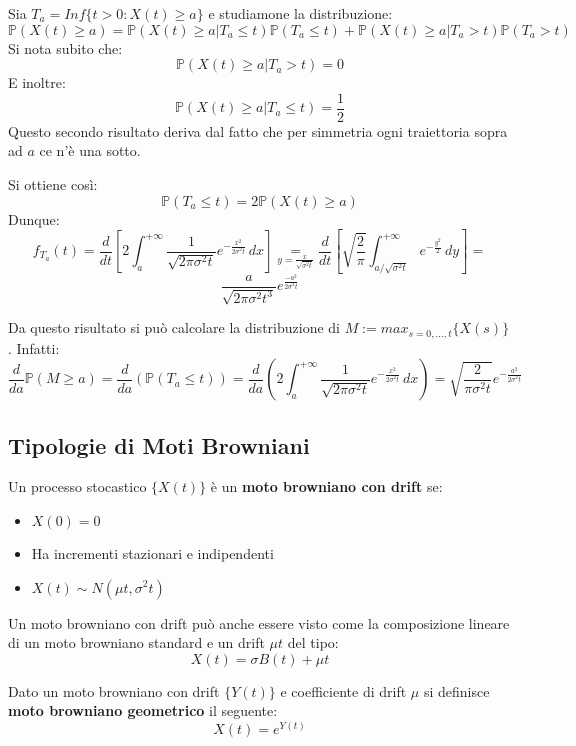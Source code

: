 \begin{example}
Sia $T_a=Inf\{t>0:X(t)\geq a\}$ e studiamone la distribuzione:
\[\mathbb{P}(X(t)\geq a)=\mathbb{P}(X(t)\geq a|T_a\leq t)\mathbb{P}(T_a\leq t)+\mathbb{P}(X(t)\geq a|T_a>t)\mathbb{P}(T_a>t)\]
Si nota subito che:
\[\mathbb{P}(X(t)\geq a|T_a > t)=0\]
E inoltre:
\[\mathbb{P}(X(t)\geq a|T_a\leq t)=\frac{1}{2}\]
Questo secondo risultato deriva dal fatto che per simmetria ogni traiettoria sopra ad $a$ ce n'è una sotto.

Si ottiene così:
\[\mathbb{P}(T_a\leq t)=2\mathbb{P}(X(t)\geq a)\]
Dunque:
\[f_{T_a}(t)=\frac{d}{dt}\left[2\int_a^{+\infty}\frac{1}{\sqrt{2\pi\sigma^2 t}}e^{-\frac{x^2}{2\sigma^2t}} \,dx\right]\underset{y=\frac{x}{\sqrt{\sigma^2t}}}{=}\frac{d}{dt}\left[\sqrt{\frac{2}{\pi}}\int_{a/\sqrt{\sigma^2t}}^{+\infty}e^{-\frac{y^2}{2}} \,dy\right]=\]
\[\frac{a}{\sqrt{2\pi\sigma^2t^3}}e^{\frac{-a^2}{2\sigma^2t}}\]
\end{example}
 Da questo risultato si può calcolare la distribuzione di $M:=max_{s=0,\dots,t}\{X(s)\}$. Infatti:
 \[\frac{d}{da}\mathbb{P}(M\geq a)=\frac{d}{da}\left(\mathbb{P}(T_a\leq t)\right)=\frac{d}{da}\left(2\int_a^{+\infty}\frac{1}{\sqrt{2\pi\sigma^2 t}}e^{-\frac{x^2}{2\sigma^2t}} \,dx\right)=\sqrt{\frac{2}{\pi\sigma^2t}}e^{-\frac{a^2}{2\sigma^2t}}\]
\subsection{Tipologie di Moti Browniani}
\begin{definition}
Un processo stocastico $\{X(t)\}$ è un \textbf{moto browniano con drift} se:
\begin{itemize}
    \item $X(0)=0$
    \item Ha incrementi stazionari e indipendenti
    \item $X(t)\sim N(\mu t,\sigma^2 t)$
\end{itemize}
\end{definition}
Un moto browniano con drift può anche essere visto come la composizione lineare di un moto browniano standard e un drift $\mu t$ del tipo:
\[X(t)=\sigma B(t)+\mu t\]

\begin{definition}
Dato un moto browniano con drift $\{Y(t)\}$ e coefficiente di drift $\mu$ si definisce \textbf{moto browniano geometrico} il seguente:
\[X(t)=e^{Y(t)}\]
\end{definition}

